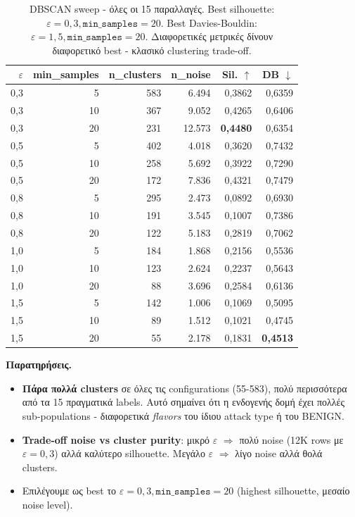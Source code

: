 \documentclass[12pt,a4paper,twoside]{book}
\begin{document}
\begin{table}[H]
    \centering
    \small
    \begin{tabular}{rrrrrr}
        \toprule
        \textbf{\(\varepsilon\)} & \textbf{min\_samples} &
        \textbf{n\_clusters} & \textbf{n\_noise} &
        \textbf{Sil. \(\uparrow\)} & \textbf{DB \(\downarrow\)} \\
        \midrule
        0{,}3 & 5  & 583 & 6.494  & 0{,}3862 & 0{,}6359 \\
        0{,}3 & 10 & 367 & 9.052  & 0{,}4265 & 0{,}6406 \\
        0{,}3 & 20 & 231 & 12.573 & \textbf{0{,}4480} & 0{,}6354 \\
        0{,}5 & 5  & 402 & 4.018  & 0{,}3620 & 0{,}7432 \\
        0{,}5 & 10 & 258 & 5.692  & 0{,}3922 & 0{,}7290 \\
        0{,}5 & 20 & 172 & 7.836  & 0{,}4321 & 0{,}7479 \\
        0{,}8 & 5  & 295 & 2.473  & 0{,}0892 & 0{,}6930 \\
        0{,}8 & 10 & 191 & 3.545  & 0{,}1007 & 0{,}7386 \\
        0{,}8 & 20 & 122 & 5.183  & 0{,}2819 & 0{,}7062 \\
        1{,}0 & 5  & 184 & 1.868  & 0{,}2156 & 0{,}5536 \\
        1{,}0 & 10 & 123 & 2.624  & 0{,}2237 & 0{,}5643 \\
        1{,}0 & 20 & 88  & 3.696  & 0{,}2584 & 0{,}6136 \\
        1{,}5 & 5  & 142 & 1.006  & 0{,}1069 & 0{,}5095 \\
        1{,}5 & 10 & 89  & 1.512  & 0{,}1021 & 0{,}4745 \\
        1{,}5 & 20 & 55  & 2.178  & 0{,}1831 & \textbf{0{,}4513} \\
        \bottomrule
    \end{tabular}
    \caption{DBSCAN sweep - όλες οι 15 παραλλαγές. Best silhouette:
    \(\varepsilon=0{,}3, \texttt{min\_samples}=20\). Best Davies-Bouldin:
    \(\varepsilon=1{,}5, \texttt{min\_samples}=20\). Διαφορετικές
    μετρικές δίνουν διαφορετικό best - κλασικό clustering trade-off.}
    \label{tab:q3_dbscan}
\end{table}

\textbf{Παρατηρήσεις.}
\begin{itemize}
    \item \textbf{Πάρα πολλά clusters} σε όλες τις configurations
    (55-583), πολύ περισσότερα από τα 15 πραγματικά labels. Αυτό
    σημαίνει ότι η ενδογενής δομή έχει πολλές sub-populations -
    διαφορετικά \emph{flavors} του ίδιου attack type ή του BENIGN.
    \item \textbf{Trade-off noise vs cluster purity}: μικρό
    \(\varepsilon\) \(\Rightarrow\) πολύ noise (12K rows με
    \(\varepsilon=0{,}3\)) αλλά καλύτερο silhouette. Μεγάλο
    \(\varepsilon\) \(\Rightarrow\) λίγο noise αλλά \og θολά\fg{}
    clusters.
    \item Επιλέγουμε ως \og best\fg{} το \(\varepsilon=0{,}3,
    \texttt{min\_samples}=20\) (highest silhouette, μεσαίο noise level).
\end{itemize}
\end{document}

